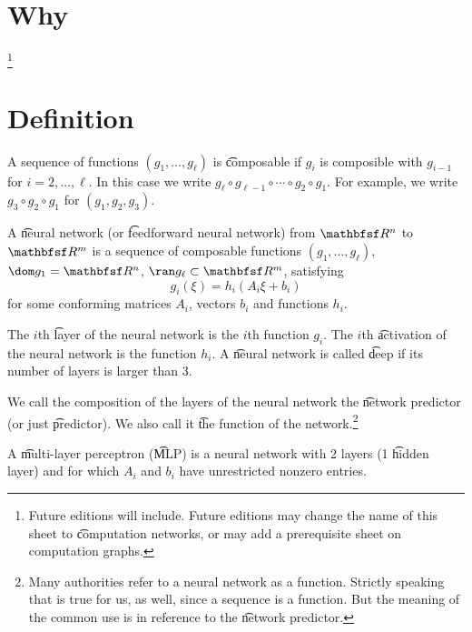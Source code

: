 

\section*{Why}
\footnote{Future editions will include. Future editions may change the name of this sheet to \t{computation networks}, or may add a prerequisite sheet on computation graphs.}
\section*{Definition}

A sequence of functions $(g_1, \dots , g_\ell )$ is \t{composable} if $g_i$ is composible with $g_{i-1}$ for $i = 2, \dots , \ell $.
In this case we write $g_\ell  \circ g_{\ell -1} \circ \cdots \circ g_2 \circ g_1$. For example, we write $g_3 \circ g_2 \circ g_1$ for $(g_1, g_2, g_3)$.

A \t{neural network} (or \t{feedforward neural network}) from $\R ^n$ to $\R ^m$ is a sequence of composable functions $(g_1, \dots , g_{\ell })$, $\dom g_1 = \R ^n$, $\ran g_\ell  \subset \R ^m$, satisfying
\[
g_i(\xi ) = h_i(A_i \xi  + b_i)
\]
for some conforming matrices $A_i$, vectors $b_i$ and functions $h_i$.

The $i$th \t{layer} of the neural network is the $i$th function $g_i$.
The $i$th \t{activation} of the neural network is the function $h_i$.
A \t{neural network} is called \t{deep} if its number of layers is larger than 3.

We call the composition of the layers of the neural network the \t{network predictor} (or just \t{predictor}).
We also call it \t{the function} of the network.\footnote{Many authorities refer to a neural network as a function. Strictly speaking that is true for us, as well, since a sequence is a function. But the meaning of the common use is in reference to the \t{network predictor}.}

A \t{multi-layer perceptron} (\t{MLP}) is a neural network with 2 layers (1 \t{hidden layer}) and for which $A_i$ and $b_i$ have unrestricted nonzero entries.


\blankpage